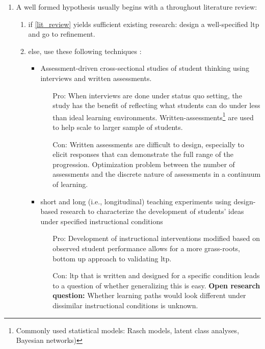 \documentclass{TC}
\begin{document}
\begin{enumerate}[(1)]
\item\label{lit_review} A well formed hypothesis usually begins with a throughout literature review: 
	\begin{enumerate} 
	\item if \ref{lit_review} yields sufficient existing research: design a well-specified \gls{ltp} and go to refinement.
	\item else, use these following techniques \parencite{duncan_learning_2018}:
		\begin{itemize}
		\item Assessment-driven cross-sectional studies of student thinking using interviews and written assessments.
			\begin{itemize}
			\item[Pro:] When interviews are done under status quo setting, the study has the benefit of reflecting what students can do under less than ideal learning environments. Written-assessments\footnote{Commonly used statistical models: Rasch models, latent class analyses, Bayesian networks)} are used to help scale to larger sample of students.
			\item[Con:] Written assessments are difficult to design, especially to elicit responses that can demonstrate the full range of the progression. Optimization problem between the number of assessments and the discrete nature of assessments in a continuum of learning.
			\end{itemize}
		\item short and long (i.e., longitudinal) teaching experiments using design-based research to characterize the development of students' ideas under specified instructional conditions
			\begin{itemize}
			\item[Pro:] Development of instructional interventions modified based on observed student performance allows for a more grass-roots, bottom up approach to validating \gls{ltp}. 
			\item[Con:] \gls{ltp} that is written and designed for a specific condition leads to a question of whether generalizing this is easy. \textbf{Open research question:} Whether learning paths would look different under dissimilar instructional conditions is unknown.
			\end{itemize}
		\end{itemize}
	\end{enumerate}
\end{enumerate}
\end{document}

